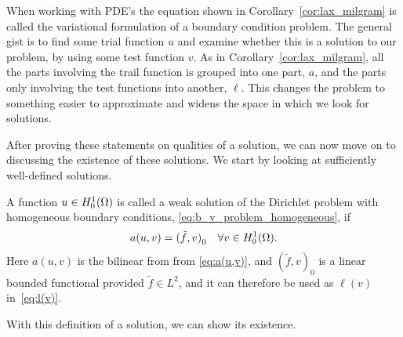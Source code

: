 When working with PDE's the equation shown in Corollary~\ref{cor:lax_milgram} 
is called the variational formulation of a boundary condition problem. 
The general gist is to find some trial function $u$ and examine whether this 
is a solution to our problem, by using some test function $v$. 
As in Corollary~\ref{cor:lax_milgram}, all the parts involving the trail function 
is grouped into one part, $a$, and the parts only involving the test functions into 
another, $\ell$.
This changes the problem to something easier to approximate and widens the 
space in which we look for solutions.

After proving these statements on qualities of a solution, we can now move 
on to discussing the existence of these solutions. We start by looking at 
sufficiently well-defined solutions. 

\begin{defn}{\quad}
    A function $u\in H_0^1(\Omega)$ is called a weak solution of 
    the Dirichlet problem with homogeneous boundary conditions,
    \eqref{eq:b_v_problem_homogeneous}, if 
     \begin{equation*}
        a(u,v) = {(\tilde{f},v)}_0 \quad \forall v \in H_0^1(\Omega).
     \end{equation*}
     Here $a(u,v)$ is the bilinear from from \eqref{eq:a(u,v)}, 
     and ${(\tilde{f},v)}_0$ is a linear bounded functional provided $\tilde{f}\in L^2$, and it can therefore be used as $\ell(v)$ in~\eqref{eq:l(v)}.
\end{defn}
With this definition of a solution, we can show its existence. %



